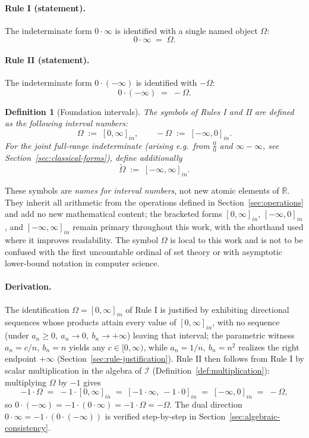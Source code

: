 \documentclass[11pt,a4paper]{article}
\theoremstyle{paperdef}
\newtheorem{definition}[theorem]{Definition}
\newcommand{\Rext}{\overline{\mathbb{R}}}
\newcommand{\Iset}{\mathcal{I}}
\newcommand{\inI}[1]{[#1]_{in}}
\begin{document}
\paragraph{Rule I (statement).} The indeterminate form
$0 \cdot \infty$ is identified with a single named object $\Omega$:
\[
0 \cdot \infty \;=\; \Omega.
\]

\paragraph{Rule II (statement).} The indeterminate form
$0 \cdot (-\infty)$ is identified with $-\Omega$:
\[
0 \cdot (-\infty) \;=\; -\Omega.
\]

\begin{definition}[Foundation intervals]\label{def:foundation-intervals}
The symbols of Rules I and II are defined as the following interval
numbers:
\[
\Omega \;:=\; \inI{0, \infty},\qquad
-\Omega \;:=\; \inI{-\infty, 0}.
\]
For the joint full-range indeterminate (arising e.g.\ from
$\tfrac{0}{0}$ and $\infty - \infty$, see
Section~\ref{sec:classical-forms}), define additionally
\[
\widetilde{\Omega} \;:=\; \inI{-\infty, \infty}.
\]
\end{definition}

These symbols are \emph{names for interval numbers}, not new atomic
elements of $\Rext$. They inherit all arithmetic from the operations
defined in Section~\ref{sec:operations} and add no new mathematical
content; the bracketed forms $\inI{0, \infty}$, $\inI{-\infty, 0}$,
and $\inI{-\infty, \infty}$ remain primary throughout this work, with
the shorthand used where it improves readability. The symbol $\Omega$
is local to this work and is not to be confused with the first
uncountable ordinal of set theory or with asymptotic lower-bound
notation in computer science.

\paragraph{Derivation.} The identification $\Omega = \inI{0, \infty}$
of Rule I is justified by exhibiting directional sequences whose
products attain every value of $\inI{0, \infty}$, with no sequence
(under $a_n \ge 0,\ a_n \to 0,\ b_n \to +\infty$) leaving that
interval; the parametric witness $a_n = c/n,\ b_n = n$ yields any
$c \in [0, \infty)$, while $a_n = 1/n,\ b_n = n^2$ realizes the right
endpoint $+\infty$ (Section~\ref{sec:rule-justification}). Rule II
then follows from Rule I by scalar multiplication in the algebra of
$\Iset$ (Definition~\ref{def:multiplication}): multiplying $\Omega$
by $-1$ gives
\[
-1 \cdot \Omega \;=\; -1 \cdot \inI{0, \infty}
\;=\; \inI{-1 \cdot \infty,\ -1 \cdot 0}
\;=\; \inI{-\infty, 0} \;=\; -\Omega,
\]
so
$0 \cdot (-\infty) = -1 \cdot (0 \cdot \infty) = -1 \cdot \Omega = -\Omega$.
The dual direction $0 \cdot \infty = -1 \cdot (0 \cdot (-\infty))$ is
verified step-by-step in Section~\ref{sec:algebraic-consistency}.
\end{document}
